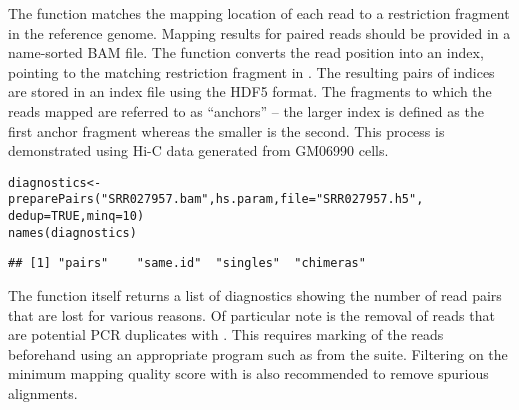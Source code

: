 \documentclass{report}\usepackage[]{graphicx}\usepackage[usenames,dvipsnames]{color}
\newcommand{\hlnum}[1]{\textcolor[rgb]{0.816,0.125,0.439}{#1}}%
\newcommand{\hlstr}[1]{\textcolor[rgb]{0.251,0.627,0.251}{#1}}%
\newcommand{\hlopt}[1]{\textcolor[rgb]{0,0,0}{#1}}%
\newcommand{\hlstd}[1]{\textcolor[rgb]{0.251,0.251,0.251}{#1}}%
\newcommand{\hlkwb}[1]{\textcolor[rgb]{0,0,0}{#1}}%
\newcommand{\hlkwc}[1]{\textcolor[rgb]{0.251,0.251,0.251}{#1}}%
\newcommand{\hlkwd}[1]{\textcolor[rgb]{0.878,0.439,0.125}{#1}}%
\newenvironment{knitrout}{}{} %
\begin{document}
The  function matches the mapping location of each read to a restriction fragment in the reference genome.
Mapping results for paired reads should be provided in a name-sorted BAM file.
The function converts the read position into an index, pointing to the matching restriction fragment in .
The resulting pairs of indices are stored in an index file using the HDF5 format.
The fragments to which the reads mapped are referred to as ``anchors'' -- the larger index is defined as the first anchor fragment whereas the smaller is the second.
This process is demonstrated using Hi-C data generated from GM06990 cells.

\begin{knitrout}
\color{fgcolor}\begin{kframe}
\begin{alltt}
\hlstd{diagnostics} \hlkwb{<-} \hlkwd{preparePairs}\hlstd{(}\hlstr{"SRR027957.bam"}\hlstd{, hs.param,} \hlkwc{file}\hlstd{=}\hlstr{"SRR027957.h5"}\hlstd{,}
                            \hlkwc{dedup}\hlstd{=}\hlnum{TRUE}\hlstd{,} \hlkwc{minq}\hlstd{=}\hlnum{10}\hlstd{)}
\hlkwd{names}\hlstd{(diagnostics)}
\end{alltt}
\begin{verbatim}
## [1] "pairs"    "same.id"  "singles"  "chimeras"
\end{verbatim}
\end{kframe}
\end{knitrout}

The function itself returns a list of diagnostics showing the number of read pairs that are lost for various reasons.
Of particular note is the removal of reads that are potential PCR duplicates with .
This requires marking of the reads beforehand using an appropriate program such as  from the  suite.
Filtering on the minimum mapping quality score with  is also recommended to remove spurious alignments.

\begin{knitrout}
\color{fgcolor}
\end{knitrout}
\end{document}

